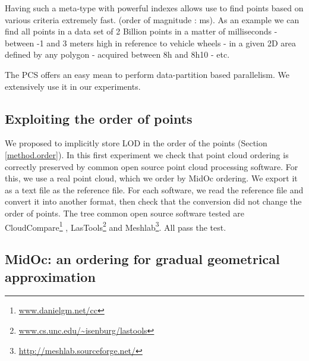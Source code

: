 		Having such a meta-type with powerful indexes allows use to find points based on various criteria extremely fast. (order of magnitude : ms). 
		As an example we can find all points in a data set of 2 Billion points in a matter of milliseconds 
		 - between -1 and 3 meters high in reference to vehicle wheels
		 - in a given 2D area defined by any polygon 
		 - acquired between 8h and 8h10 - etc.
		 
		The PCS offers an easy mean to perform data-partition based parallelism. We extensively use it in our experiments. 


	\subsection{Exploiting the order of points}
		\label{result.os_softwares}
		We proposed to implicitly store LOD in the order of the points (Section \ref{method.order}).
		In this first experiment we check that point cloud ordering is correctly preserved by common open source point cloud processing software.
		For this, we use a real point cloud, which we order by MidOc ordering. 
		We export it as a text file as the reference file.
		For each software, we read the reference file and convert it into another format, then check that the conversion did not change the order of points. 
		The tree common open source software tested are CloudCompare\footnote{\url{www.danielgm.net/cc}}
		, LasTools\footnote{\url{www.cs.unc.edu/~isenburg/lastools}} and Meshlab\footnote{\url{http://meshlab.sourceforge.net/}}.
		All pass the test.
			
	\subsection{MidOc: an ordering for gradual geometrical approximation}
		
